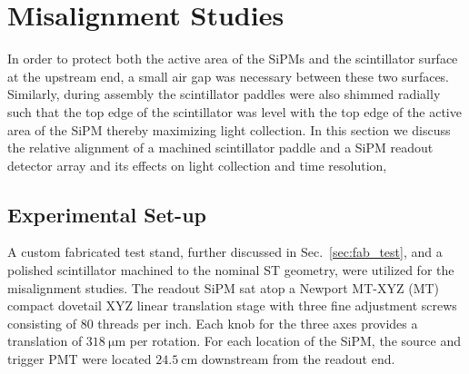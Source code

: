\section{Misalignment Studies} \label{sec:misalign}

In order to protect both the active area of the SiPMs and the scintillator surface at the upstream end, a small air gap was necessary between these two surfaces.  Similarly, during assembly the scintillator paddles were also shimmed radially such that the top edge of the scintillator was level with the top edge of the active area of the SiPM thereby maximizing light collection.  In this section we discuss the relative alignment of a machined scintillator paddle and a SiPM readout detector array and its effects on light collection and time resolution,

\subsection{Experimental Set-up} \label{sec:misalign_setup}

A custom fabricated test stand, further discussed in Sec.~\ref{sec:fab_test}, and a polished scintillator machined to the nominal ST geometry, were utilized for the misalignment studies.  The readout SiPM sat atop a Newport MT-XYZ (MT) compact dovetail XYZ linear translation stage\cite{newport_mt_xyz} with three fine adjustment screws consisting of 80 threads per inch.  Each knob for the three axes provides a translation of $318\ \mathrm{\mu m}$ per rotation.  For each location of the SiPM, the source and trigger PMT were located $\mathrm{24.5~cm}$ downstream from the readout end. 


